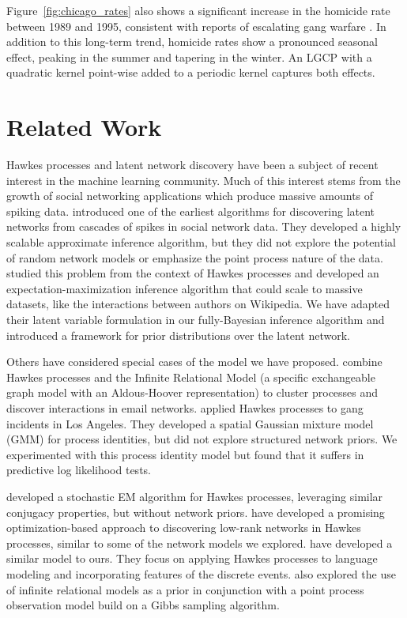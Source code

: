 Figure~\ref{fig:chicago_rates} also shows a significant increase in
the homicide rate between 1989 and 1995, consistent with reports of
escalating gang warfare \citep{Block-1993}. In addition to this
long-term trend, homicide rates show a pronounced seasonal effect,
peaking in the summer and tapering in the winter. An LGCP with a
quadratic kernel point-wise added to a periodic kernel captures both
effects.

\section{Related Work}
Hawkes processes and latent network discovery have been a subject
of recent interest in the machine learning community. Much of this
interest stems from the growth of social networking applications
which produce massive amounts of spiking data. 
\citet{Gomez-2010} introduced one of the earliest algorithms for
discovering latent networks from cascades of spikes in social network
data. They developed a
highly scalable approximate inference algorithm, but they did not
explore the potential of random network models or emphasize the point
process nature of the data.
\citet{Simma-2010} studied this problem from the context of Hawkes
processes and developed an expectation-maximization inference
algorithm that could scale to massive datasets, like the interactions
between authors on Wikipedia.
We have adapted their latent variable formulation in our
fully-Bayesian inference algorithm and introduced a framework for
prior distributions over the latent network.

Others have considered special cases of the model we have
proposed. \citet{Blundell-2012} combine Hawkes processes and the
Infinite Relational Model (a specific exchangeable graph model with an
Aldous-Hoover representation) to cluster processes and discover
interactions in email networks. \citet{Cho-2013} applied Hawkes processes to gang
incidents in Los Angeles. They developed a spatial Gaussian mixture
model (GMM) for process identities, but did not explore structured
network priors. We experimented with this process identity model but
found that it suffers in predictive log likelihood tests.

\citet{Iwata-2013} developed a stochastic EM algorithm for
Hawkes processes, leveraging similar conjugacy properties, but without
network priors. \citet{Zhou-2013} have developed a promising
optimization-based approach to discovering low-rank networks in Hawkes
processes, similar to some of the network models we explored.
\citet{Guo-2014} have developed a similar model to ours. They focus on
applying Hawkes processes to language modeling and incorporating
features of the discrete events. \citet{Dubois-2013} also explored the
use of infinite relational models as a prior in conjunction with a
point process observation model build on a Gibbs sampling algorithm.



